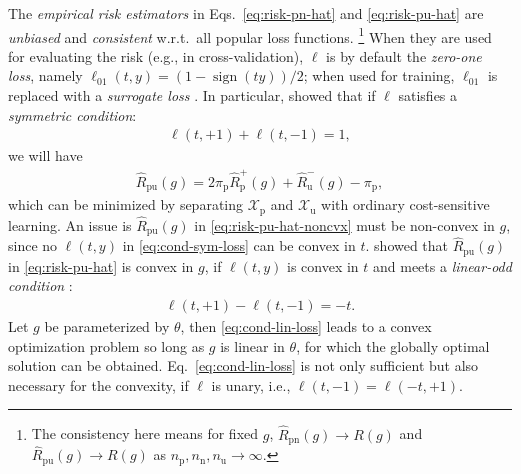 \documentclass{article}
\DeclareMathOperator{\sign}{\mathrm{sign}}
\newcommand{\cX}{\mathcal{X}}
\newcommand{\pip}{\pi_\mathrm{p}}
\newcommand{\Xp}{\cX_\mathrm{p}}
\newcommand{\Xu}{\cX_\mathrm{u}}
\newcommand{\Np}{{n_\mathrm{p}}}
\newcommand{\Nn}{{n_\mathrm{n}}}
\newcommand{\Nu}{{n_\mathrm{u}}}
\newcommand{\hRp}{\widehat{R}_\mathrm{p}}
\newcommand{\hRu}{\widehat{R}_\mathrm{u}}
\newcommand{\hRpn}{\widehat{R}_\mathrm{pn}}
\newcommand{\hRpu}{\widehat{R}_\mathrm{pu}}
\begin{document}
The \emph{empirical risk estimators} in Eqs.~\eqref{eq:risk-pn-hat} and \eqref{eq:risk-pu-hat} are \emph{unbiased} and \emph{consistent} w.r.t.\ all popular loss functions.%
\footnote{The consistency here means for fixed $g$, $\hRpn(g)\to R(g)$ and $\hRpu(g)\to R(g)$ as $\Np,\Nn,\Nu\to\infty$.}
When they are used for evaluating the risk (e.g., in cross-validation), $\ell$ is by default the \emph{zero-one loss}, namely $\ell_{01}(t,y)=(1-\sign(ty))/2$; when used for training, $\ell_{01}$ is replaced with a \emph{surrogate loss} \citep{bartlett06jasa}. In particular, \cite{christo14nips} showed that if $\ell$ satisfies a \emph{symmetric condition}:
\begin{align}
\label{eq:cond-sym-loss}%
\ell(t,+1)+\ell(t,-1)=1,
\end{align}
we will have
\begin{align}
\label{eq:risk-pu-hat-noncvx}%
\hRpu(g)=2\pip\hRp^+(g)+\hRu^-(g)-\pip,
\end{align}
which can be minimized by separating $\Xp$ and $\Xu$ with ordinary cost-sensitive learning. An issue is $\hRpu(g)$ in \eqref{eq:risk-pu-hat-noncvx} must be non-convex in $g$, since no $\ell(t,y)$ in \eqref{eq:cond-sym-loss} can be convex in $t$. \cite{christo15icml} showed that $\hRpu(g)$ in \eqref{eq:risk-pu-hat} is convex in $g$, if $\ell(t,y)$ is convex in $t$ and meets a \emph{linear-odd condition} \citep{natarajan13nips,patrini16icml}:
\begin{align}
\label{eq:cond-lin-loss}%
\ell(t,+1)-\ell(t,-1)=-t.
\end{align}
Let $g$ be parameterized by $\theta$, then \eqref{eq:cond-lin-loss} leads to a convex optimization problem so long as $g$ is linear in $\theta$, for which the globally optimal solution can be obtained. Eq.~\eqref{eq:cond-lin-loss} is not only sufficient but also necessary for the convexity, if $\ell$ is unary, i.e., $\ell(t,-1)=\ell(-t,+1)$.

\end{document}

